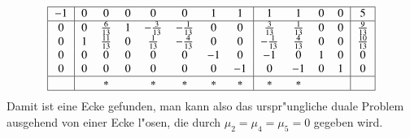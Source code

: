 \begin{beispiel}
\[\begin{tabular}{|>{$}c<{$}|>{$}c<{$}>{$}c<{$}>{$}c<{$}>{$}c<{$}>{$}c<{$}>{$}c<{$}>{$}c<{$}|>{$}c<{$}>{$}c<{$}>{$}c<{$}>{$}c<{$}|>{$}c<{$}|}
\hline
-1&           0&             0&    0&           0&            0&  1&  1&            1&           1&  0&  0&      5\\
\hline
 0&           0& \frac{6}{13}&    1&-\frac{3}{13}&-\frac{1}{13}&  0&  0& \frac{3}{13}&\frac{1}{13}&  0&  0&\frac{9}{13}\\
 0&           1&\frac{11}{13}&    0& \frac{1}{13}&-\frac{4}{13}&  0&  0&-\frac{1}{13}&\frac{4}{13}&  0&  0&\frac{10}{13}\\
 0&           0&            0&    0&            0&            0& -1&  0&           -1&           0&  1&  0&      0\\
 0&           0&            0&    0&            0&            0&  0& -1&            0&          -1&  0&  1&      0\\
\hline
  &            &             *&     &           *&            *&  *&  *&            *&           *&   &   &       \\
\hline
\end{tabular}
\]
Damit ist eine Ecke gefunden, man kann also das urspr"ungliche duale Problem ausgehend
von einer Ecke l"osen, die durch $\mu_2=\mu_4=\mu_5=0$ gegeben wird. 


\end{beispiel}
